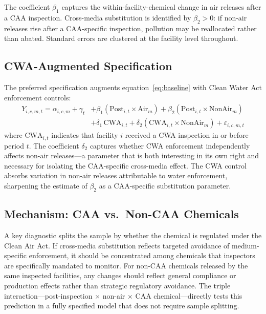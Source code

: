 \documentclass[12pt]{article}
\begin{document}
The coefficient $\beta_1$ captures the within-facility-chemical change in air releases after a CAA inspection. Cross-media substitution is identified by $\beta_2 > 0$: if non-air releases rise after a CAA-specific inspection, pollution may be reallocated rather than abated. Standard errors are clustered at the facility level throughout.

\subsection{CWA-Augmented Specification}

The preferred specification augments equation~\eqref{eq:baseline} with Clean Water Act enforcement controls:
\begin{equation}
\label{eq:cwa}
\begin{split}
Y_{i,c,m,t} = \alpha_{i,c,m} + \gamma_t &+ \beta_1 (\text{Post}_{i,t} \times \text{Air}_m) + \beta_2 (\text{Post}_{i,t} \times \text{NonAir}_m) \\
&+ \delta_1 \, \text{CWA}_{i,t} + \delta_2 (\text{CWA}_{i,t} \times \text{NonAir}_m) + \varepsilon_{i,c,m,t}
\end{split}
\end{equation}
where $\text{CWA}_{i,t}$ indicates that facility $i$ received a CWA inspection in or before period $t$. The coefficient $\delta_2$ captures whether CWA enforcement independently affects non-air releases---a parameter that is both interesting in its own right and necessary for isolating the CAA-specific cross-media effect. The CWA control absorbs variation in non-air releases attributable to water enforcement, sharpening the estimate of $\beta_2$ as a CAA-specific substitution parameter.

\subsection{Mechanism: CAA vs.\ Non-CAA Chemicals}

A key diagnostic splits the sample by whether the chemical is regulated under the Clean Air Act. If cross-media substitution reflects targeted avoidance of medium-specific enforcement, it should be concentrated among chemicals that inspectors are specifically mandated to monitor. For non-CAA chemicals released by the same inspected facilities, any changes should reflect general compliance or production effects rather than strategic regulatory avoidance. The triple interaction---post-inspection $\times$ non-air $\times$ CAA chemical---directly tests this prediction in a fully specified model that does not require sample splitting.
\end{document}
